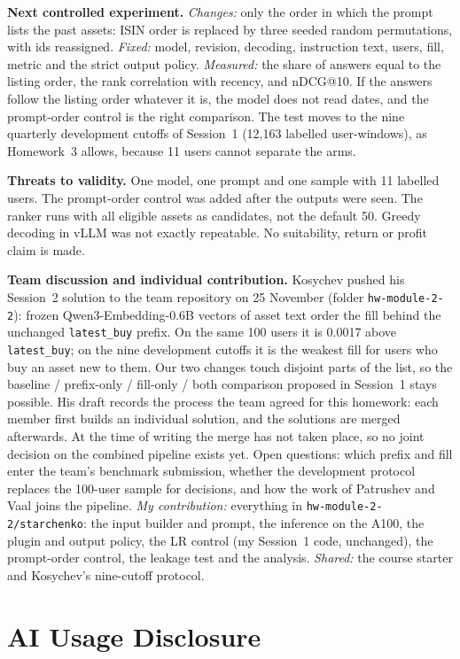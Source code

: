 \documentclass[conference]{IEEEtran}
\begin{document}
\textbf{Next controlled experiment.} \emph{Changes:} only the order in which the prompt lists the past assets: ISIN order is replaced by three seeded random permutations, with ids reassigned. \emph{Fixed:} model, revision, decoding, instruction text, users, fill, metric and the strict output policy. \emph{Measured:} the share of answers equal to the listing order, the rank correlation with recency, and nDCG@10. If the answers follow the listing order whatever it is, the model does not read dates, and the prompt-order control is the right comparison. The test moves to the nine quarterly development cutoffs of Session~1 (12{,}163 labelled user-windows), as Homework~3 allows, because 11 users cannot separate the arms.

\textbf{Threats to validity.} One model, one prompt and one sample with 11 labelled users. The prompt-order control was added after the outputs were seen. The ranker runs with all eligible assets as candidates, not the default 50. Greedy decoding in vLLM was not exactly repeatable. No suitability, return or profit claim is made.

\textbf{Team discussion and individual contribution.} Kosychev pushed his Session~2 solution to the team repository on 25 November (folder \texttt{hw-module-2-2}): frozen Qwen3-Embedding-0.6B vectors of asset text order the fill behind the unchanged \texttt{latest\_buy} prefix. On the same 100 users it is 0.0017 above \texttt{latest\_buy}; on the nine development cutoffs it is the weakest fill for users who buy an asset new to them. Our two changes touch disjoint parts of the list, so the baseline / prefix-only / fill-only / both comparison proposed in Session~1 stays possible. His draft records the process the team agreed for this homework: each member first builds an individual solution, and the solutions are merged afterwards. At the time of writing the merge has not taken place, so no joint decision on the combined pipeline exists yet. Open questions: which prefix and fill enter the team's benchmark submission, whether the development protocol replaces the 100-user sample for decisions, and how the work of Patrushev and Vaal joins the pipeline. \emph{My contribution:} everything in \texttt{hw-module-2-2/starchenko}: the input builder and prompt, the inference on the A100, the plugin and output policy, the LR control (my Session~1 code, unchanged), the prompt-order control, the leakage test and the analysis. \emph{Shared:} the course starter and Kosychev's nine-cutoff protocol.

\section{AI Usage Disclosure}
\end{document}
